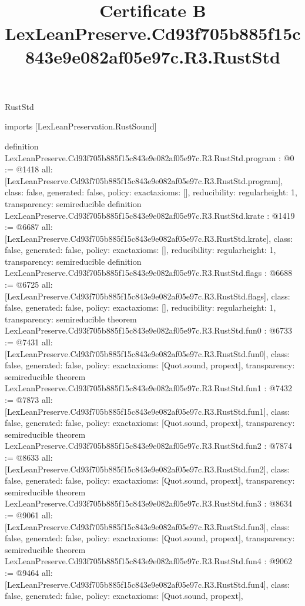 \begin{lexlean}{RustStd}
\title{Certificate B LexLeanPreserve.Cd93f705b885f15c843e9e082af05e97c.R3.RustStd}
\begin{coremodule}
imports [LexLeanPreservation.RustSound]

definition LexLeanPreserve.Cd93f705b885f15c843e9e082af05e97c.R3.RustStd.program : @0 := @1418 {
  all: [LexLeanPreserve.Cd93f705b885f15c843e9e082af05e97c.R3.RustStd.program],
  class: false,
  generated: false,
  policy: exact{axioms: []},
  reducibility: regular{height: 1},
  transparency: semireducible
}
definition LexLeanPreserve.Cd93f705b885f15c843e9e082af05e97c.R3.RustStd.krate : @1419 := @6687 {
  all: [LexLeanPreserve.Cd93f705b885f15c843e9e082af05e97c.R3.RustStd.krate],
  class: false,
  generated: false,
  policy: exact{axioms: []},
  reducibility: regular{height: 1},
  transparency: semireducible
}
definition LexLeanPreserve.Cd93f705b885f15c843e9e082af05e97c.R3.RustStd.flags : @6688 := @6725 {
  all: [LexLeanPreserve.Cd93f705b885f15c843e9e082af05e97c.R3.RustStd.flags],
  class: false,
  generated: false,
  policy: exact{axioms: []},
  reducibility: regular{height: 1},
  transparency: semireducible
}
theorem LexLeanPreserve.Cd93f705b885f15c843e9e082af05e97c.R3.RustStd.fun0 : @6733 := @7431 {
  all: [LexLeanPreserve.Cd93f705b885f15c843e9e082af05e97c.R3.RustStd.fun0],
  class: false,
  generated: false,
  policy: exact{axioms: [Quot.sound, propext]},
  transparency: semireducible
}
theorem LexLeanPreserve.Cd93f705b885f15c843e9e082af05e97c.R3.RustStd.fun1 : @7432 := @7873 {
  all: [LexLeanPreserve.Cd93f705b885f15c843e9e082af05e97c.R3.RustStd.fun1],
  class: false,
  generated: false,
  policy: exact{axioms: [Quot.sound, propext]},
  transparency: semireducible
}
theorem LexLeanPreserve.Cd93f705b885f15c843e9e082af05e97c.R3.RustStd.fun2 : @7874 := @8633 {
  all: [LexLeanPreserve.Cd93f705b885f15c843e9e082af05e97c.R3.RustStd.fun2],
  class: false,
  generated: false,
  policy: exact{axioms: [Quot.sound, propext]},
  transparency: semireducible
}
theorem LexLeanPreserve.Cd93f705b885f15c843e9e082af05e97c.R3.RustStd.fun3 : @8634 := @9061 {
  all: [LexLeanPreserve.Cd93f705b885f15c843e9e082af05e97c.R3.RustStd.fun3],
  class: false,
  generated: false,
  policy: exact{axioms: [Quot.sound, propext]},
  transparency: semireducible
}
theorem LexLeanPreserve.Cd93f705b885f15c843e9e082af05e97c.R3.RustStd.fun4 : @9062 := @9464 {
  all: [LexLeanPreserve.Cd93f705b885f15c843e9e082af05e97c.R3.RustStd.fun4],
  class: false,
  generated: false,
  policy: exact{axioms: [Quot.sound, propext]},
}
\end{coremodule}
\end{lexlean}
